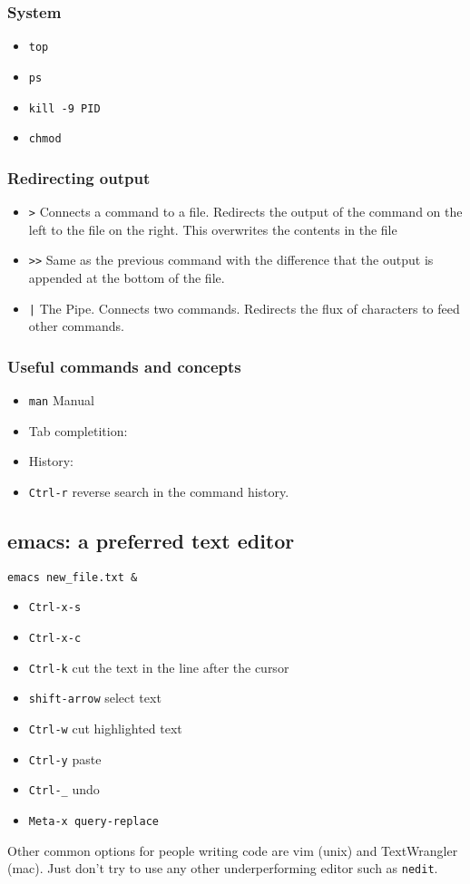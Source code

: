 \documentclass{article}
\begin{document}
\subsubsection*{System}
\begin{itemize}
\item\verb"top"
\item\verb"ps "
\item\verb"kill -9 PID"
\item\verb"chmod"
\end{itemize}



\subsubsection*{Redirecting output}
\begin{itemize}
\item\verb">" Connects a command to a file. Redirects the output of the command on the left to the file on the right. This overwrites the contents in the file 
\item\verb">>" Same as the previous command with the difference that the output is appended at the bottom of the file.
\item\verb"|" The Pipe. Connects two commands. Redirects the flux of characters to feed other commands.
\end{itemize}

\subsubsection*{Useful commands and concepts}
\begin{itemize}
\item\verb"man" Manual 
\item Tab completition:
\item History:
\item\verb"Ctrl-r" reverse search in the command history.
\end{itemize}

\subsection{emacs: a preferred text editor}

\begin{verbatim}
emacs new_file.txt &
\end{verbatim}

\begin{itemize}
\item\verb"Ctrl-x-s"
\item\verb"Ctrl-x-c"
\item\verb"Ctrl-k" cut the text in the line after the cursor
\item\verb"shift-arrow" select text
\item\verb"Ctrl-w" cut highlighted text
\item\verb"Ctrl-y" paste
\item\verb"Ctrl-_" undo
\item\verb"Meta-x query-replace"
\end{itemize}

Other common options for people writing code are vim (unix) and TextWrangler (mac). Just don't try to use any other underperforming editor such as \verb"nedit".
\end{document}
